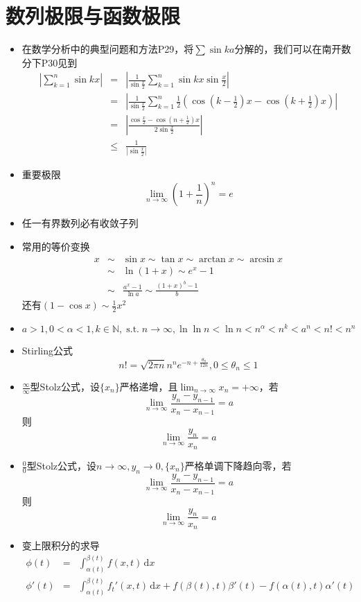 \documentclass[UTF8]{ctexart}
\newcommand{\ud}{\,\mathrm{d}}
\DeclareMathOperator{\st}{s.t.}
\begin{document}
\section{数列极限与函数极限}
\begin{itemize}
\item 在数学分析中的典型问题和方法P29，将$\sum \sin ka$分解的，我们可以在南开数分下P30见到
\begin{eqnarray*}
\left|\sum_{k=1}^n \sin kx \right| & = & \left|\frac{1}{\sin \frac{x}{2}}\sum_{k=1}^n \sin kx\sin \frac{x}{2} \right|\\
& = & \left|\frac{1}{\sin \frac{x}{2}}\sum_{k=1}^n \frac{1}{2}\left(\cos \left(k-\frac{1}{2}\right)x - \cos \left(k+\frac{1}{2}\right)x\right)\right|\\
& = & \left| \frac{\cos \frac{x}{2}-\cos(n+\frac{1}{2})x}{2\sin\frac{x}{2}}\right|\\
& \leq & \frac{1}{|\sin\frac{x}{2}|}
\end{eqnarray*}

\item 重要极限
\[
\lim_{n\to \infty} \left(1+\frac{1}{n} \right)^n = e
\]

\item 任一有界数列必有收敛子列

\item 常用的等价变换
\begin{eqnarray*}
x&\sim& \sin x \sim \tan x \sim \arctan x \sim \arcsin x\\
&\sim& \ln(1+x) \sim e^x-1\\
&\sim&\frac{a^x-1}{\ln a} \sim \frac{(1+x)^b-1}{b}
\end{eqnarray*}
还有$(1-\cos x)\sim \frac{1}{2}x^2$

\item $a>1,0<\alpha<1,k \in \mathbb{N},\st n\to \infty,\ln\ln n <\ln n < n^\alpha < n^k <a^n < n! < n^n $ 

\item Stirling公式
\[
n! = \sqrt{2\pi n} n^n e^{-n+\frac{\theta_n}{12n}},0\leq \theta_n \leq 1
\]

\item $\frac{\infty}{\infty}$型Stolz公式，设$\{x_n\}$严格递增，且$\lim_{n\to \infty}x_n=+\infty$，若
\[
\lim_{n\to \infty} \frac{y_n-y_{n-1}}{x_n-x_{n-1}} = a
\]
则
\[
\lim_{n\to \infty} \frac{y_n}{x_n} = a
\]

\item $\frac{0}{0}$型Stolz公式，设$n\to \infty ,y_n\to 0,\{x_n\}$严格单调下降趋向零，若
\[
\lim_{n\to \infty} \frac{y_n-y_{n-1}}{x_n-x_{n-1}} = a
\]
则
\[
\lim_{n\to \infty} \frac{y_n}{x_n} = a
\]

\item 变上限积分的求导
\begin{eqnarray*}
\phi(t) & = & \int_{\alpha (t)}^{\beta (t)} f(x,t) \ud x\\
\phi'(t) & = & \int_{\alpha (t)}^{\beta (t)} f_t'(x,t) \ud x + f(\beta (t),t)\beta' (t)- f(\alpha (t),t)\alpha' (t)
\end{eqnarray*}
\end{itemize}
\end{document}
